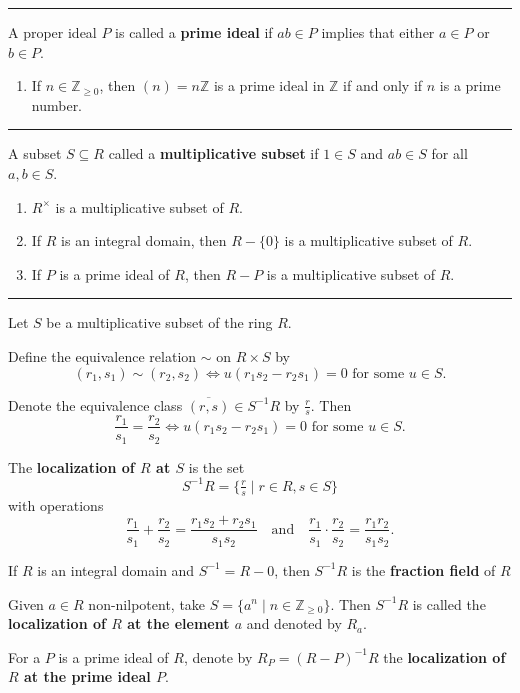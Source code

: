 \documentclass[12pt]{article}
\newcommand{\keyword}[1]{\textbf{#1}}
\newcommand{\sepline}{\rule{\textwidth}{0.4pt}}
\theoremstyle{definition}
\newcommand{\isp}[1]{\quad\text{#1}\quad}
\newcommand{\Z}{\mathbb{Z}}
\newcommand{\Zpos}{\mathbb{Z}_{\geq0}}
\newcommand{\<}{\left\langle}
\renewcommand{\>}{\right\rangle}
\newcommand{\eqc}{\overline}
\begin{document}
\sepline

A proper ideal $P$ is called a \keyword{prime ideal} if $ab \in P$ implies that either $a \in P$ or $b \in P$.

\begin{enumerate}
    \item If $n \in \Zpos$, then $(n) = n\Z$ is a prime ideal in $\Z$ if and only if $n$ is a prime number.
\end{enumerate}

\sepline

A subset $S \subseteq R$ called a \keyword{multiplicative subset} if $1 \in S$ and $ab \in S$ for all $a, b \in S$. 

\begin{enumerate}
    \item $R^\times$ is a multiplicative subset of $R$.
    
    \item If $R$ is an integral domain, then $R - \{0\}$ is a multiplicative subset of $R$.
    
    \item If $P$ is a prime ideal of $R$, then $R - P$ is a multiplicative subset of $R$.
\end{enumerate}

\sepline

Let $S$ be a multiplicative subset of the ring $R$.

Define the equivalence relation $\sim$ on $R \times S$ by
\[
    (r_1, s_1) \sim (r_2, s_2) \iff u(r_1s_2 - r_2s_1) = 0 \text{ for some } u \in S.
\]

Denote the equivalence class $\eqc{(r, s)} \in S^{-1}R$ by $\frac{r}{s}$. Then
\[
    \frac{r_1}{s_1} = \frac{r_2}{s_2} \iff u(r_1s_2 - r_2s_1) = 0 \text{ for some } u \in S.
\]

The \keyword{localization of $R$ at $S$} is the set
\[
    S^{-1}R = \{\tfrac{r}{s} \mid r \in R, s \in S\}
\]
with operations
\[
    \frac{r_1}{s_1} + \frac{r_2}{s_2} = \frac{r_1s_2 + r_2s_1}{s_1s_2}
    \isp{and}
    \frac{r_1}{s_1} \cdot \frac{r_2}{s_2} = \frac{r_1r_2}{s_1s_2}.
\]

If $R$ is an integral domain and $S^{-1} = R - 0$, then $S^{-1}R$ is the \keyword{fraction field} of $R$

Given $a \in R$ non-nilpotent, take $S = \{a^n \mid n \in \Zpos\}$. Then $S^{-1}R$ is called the \keyword{localization of $R$ at the element $a$} and denoted by $R_a$.

For a $P$ is a prime ideal of $R$, denote by $R_P = (R - P)^{-1}R$ the \keyword{localization of $R$ at the prime ideal $P$}.
\end{document}
